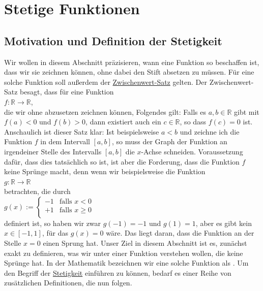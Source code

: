 \chapter{Stetige Funktionen}
\section{Motivation und Definition der Stetigkeit}
Wir wollen in diesem Abschnitt pr\"azisieren, wann eine Funktion so beschaffen ist, dass wir sie zeichnen
k\"onnen, ohne dabei den Stift absetzen zu m\"ussen.  F\"ur eine solche Funktion soll au{\ss}erdem der 
\href{https://de.wikipedia.org/wiki/Zwischenwertsatz}{Zwischenwert-Satz} gelten.  Der Zwischenwert-Satz besagt, 
dass f\"ur eine Funktion 
\\[0.2cm]
\hspace*{1.3cm}
$f: \mathbb{R} \rightarrow \mathbb{R}$,
\\[0.2cm]
die wir ohne abzusetzen zeichnen k\"onnen, Folgendes gilt:
Falls es $a,b \in \mathbb{R}$ gibt mit $f(a) < 0$ und $f(b) > 0$, dann existiert auch ein $c \in\mathbb{R}$, 
so dass $f(c) = 0$ ist.  Anschaulich ist dieser Satz klar:  Ist beispielsweise $a < b$
und zeichne ich die Funktion $f$ in dem Intervall $[a, b]$, so muss der Graph der Funktion an irgendeiner
Stelle des Intervalls $[a,b]$ die $x$-Achse schneiden.  Voraussetzung daf\"ur, dass dies tats\"achlich so
ist, ist aber die Forderung, dass die Funktion $f$ keine Spr\"unge macht, denn wenn wir
beispielsweise die Funktion 
\\[0.2cm]
\hspace*{1.3cm}
$g: \mathbb{R} \rightarrow \mathbb{R}$
\\[0.2cm]
betrachten, die durch 
\\[0.2cm]
\hspace*{1.3cm}
$g(x) := \left\{
 \begin{array}{ll}
 -1 & \mbox{falls $x <    0$} \\ 
 +1 & \mbox{falls $x \geq 0$} \\ 
 \end{array}
 \right.
$
\\[0.2cm]
definiert ist, so haben wir zwar  $g(-1) = -1$ und $g(1) = 1$, aber es gibt kein $x \in [-1,1]$, 
f\"ur das $g(x) = 0$ w\"are.   Das liegt daran, dass die Funktion an der Stelle $x = 0$ einen Sprung
hat.  Unser Ziel in diesem Abschnitt ist es, zun\"achst exakt zu
definieren, was wir unter einer Funktion verstehen wollen, die keine Spr\"unge hat.  
In der Mathematik bezeichnen wir eine solche Funktion als  .
Um den Begriff der \href{https://de.wikipedia.org/wiki/Stetigkeit}{Stetigkeit}
 einf\"uhren zu k\"onnen, bedarf es einer Reihe von zus\"atzlichen Definitionen, die nun folgen.

